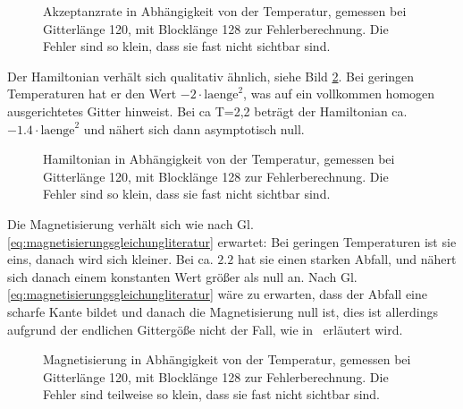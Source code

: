 	\begin{figure}[htbp]
		
		\caption[Akzeptanzrate in Abhängigkeit von der Temperatur]{Akzeptanzrate in Abhängigkeit von der Temperatur, gemessen bei Gitterlänge 120, mit Blocklänge 128 zur Fehlerberechnung. Die Fehler sind so klein, dass sie fast nicht sichtbar sind.}
		\label{fig:ergebnisakzeptanzrate}
	\end{figure}
	
	Der Hamiltonian verhält sich qualitativ ähnlich, siehe Bild \ref{fig:ergebnishamiltonian}. Bei geringen Temperaturen hat er den Wert $-2\cdot\text{laenge}^2$, was auf ein vollkommen homogen ausgerichtetes Gitter hinweist. Bei ca T=2,2 beträgt der Hamiltonian ca. $-\num{1,4}\cdot\text{laenge}^2$ und nähert sich dann asymptotisch null.
	
	\begin{figure}[htbp]
		
		\caption[Hamiltonian in Abhängigkeit von der Temperatur]{Hamiltonian in Abhängigkeit von der Temperatur, gemessen bei Gitterlänge 120, mit Blocklänge 128 zur Fehlerberechnung. Die Fehler sind so klein, dass sie fast nicht sichtbar sind.}
		\label{fig:ergebnishamiltonian}
	\end{figure}
	

	Die Magnetisierung verhält sich wie nach Gl. \ref{eq:magnetisierungsgleichungliteratur} erwartet: Bei geringen Temperaturen ist sie eins, danach wird sich kleiner. Bei ca. $\num{2,2}$ hat sie einen starken Abfall, und nähert sich danach einem konstanten Wert größer als null an. Nach Gl. \ref{eq:magnetisierungsgleichungliteratur} wäre zu erwarten, dass der Abfall eine scharfe Kante bildet und danach die Magnetisierung null ist, dies ist allerdings aufgrund der endlichen Gittergöße nicht der Fall, wie in~\cite[Abschnitt 2.3.3]{binderheermann} erläutert wird.

	
	\begin{figure}[htbp]
		
		\caption[Magnetisierung in Abhängigkeit von der Temperatur]{Magnetisierung in Abhängigkeit von der Temperatur, gemessen bei Gitterlänge 120, mit Blocklänge 128 zur Fehlerberechnung. Die Fehler sind teilweise so klein, dass sie fast nicht sichtbar sind.}
		\label{fig:ergebnismagnetisierung}
	\end{figure}	
	
